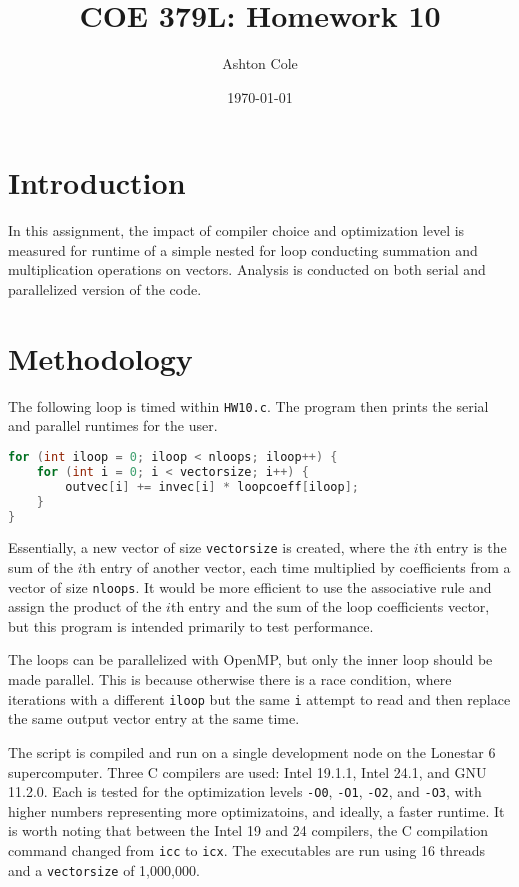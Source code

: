 \documentclass{article}
\title{COE 379L: Homework 10}
\author{Ashton Cole}
\date{\today}
\begin{document}
\maketitle

\section{Introduction}

In this assignment, the impact of compiler choice and optimization level is measured for runtime of a simple nested for loop conducting summation and multiplication operations on vectors. Analysis is conducted on both serial and parallelized version of the code.

\section{Methodology}

The following loop is timed within \verb|HW10.c|. The program then prints the serial and parallel runtimes for the user.

\begin{lstlisting}[language=C]
for (int iloop = 0; iloop < nloops; iloop++) {
	for (int i = 0; i < vectorsize; i++) {
		outvec[i] += invec[i] * loopcoeff[iloop];
	}
}
\end{lstlisting}

Essentially, a new vector of size \verb|vectorsize| is created, where the $i$th entry is the sum of the $i$th entry of another vector, each time multiplied by coefficients from a vector of size \verb|nloops|. It would be more efficient to use the associative rule and assign the product of the $i$th entry and the sum of the loop coefficients vector, but this program is intended primarily to test performance.

The loops can be parallelized with OpenMP, but only the inner loop should be made parallel. This is because otherwise there is a race condition, where iterations with a different \verb|iloop| but the same \verb|i| attempt to read and then replace the same output vector entry at the same time.

The script is compiled and run on a single development node on the Lonestar 6 supercomputer. Three C compilers are used: Intel 19.1.1, Intel 24.1, and GNU 11.2.0. Each is tested for the optimization levels \verb|-O0|, \verb|-O1|, \verb|-O2|, and \verb|-O3|, with higher numbers representing more optimizatoins, and ideally, a faster runtime. It is worth noting that between the Intel 19 and 24 compilers, the C compilation command changed from \verb|icc| to \verb|icx|. The executables are run using 16 threads and a \verb|vectorsize| of 1,000,000.
\end{document}
